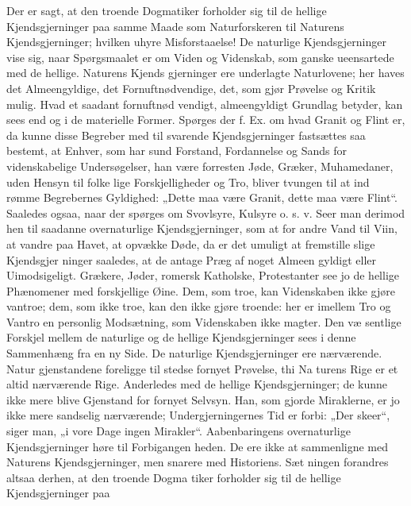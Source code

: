 \documentclass[12pt]{book}
\newcommand{\opage}[1]{\marginnote{\footnotesize\textit{[#1]}}}
\begin{document}
Der er sagt, at den troende Dogmatiker forholder
sig til de hellige Kjendsgjerninger paa samme Maade
som Naturforskeren til Naturens Kjendsgjerninger; hvilken
uhyre Misforstaaelse! De naturlige Kjendsgjerninger vise
sig, naar Spørgsmaalet er om Viden og Videnskab, som
ganske ueensartede med de hellige. Naturens Kjends\-%
gjerninger ere underlagte Naturlovene; her haves det
Almeengyldige, det Fornuftnødvendige, det, som gjør
Prøvelse og Kritik mulig. Hvad et saadant fornuftnød\-%
vendigt, almeengyldigt Grundlag betyder, kan sees end\-%
\opage{81}\setcounter{footnote}{0}%
og i de materielle Former. Spørges der f. Ex. om hvad
Granit og Flint er, da kunne disse Begreber med til\-%
svarende Kjendsgjerninger fastsættes saa bestemt, at
Enhver, som har sund Forstand, Fordannelse og Sands
for videnskabelige Undersøgelser, han være forresten
Jøde, Græker, Muhamedaner, uden Hensyn til folke\-%
lige Forskjelligheder og Tro, bliver tvungen til at ind\-%
rømme Begrebernes Gyldighed: „Dette maa være Granit,
dette maa være Flint“. Saaledes ogsaa, naar der spørges
om Svovlsyre, Kulsyre o. s. v. Seer man derimod hen
til saadanne overnaturlige Kjendsgjerninger, som at for\-%
andre Vand til Viin, at vandre paa Havet, at opvække
Døde, da er det umuligt at fremstille slige Kjendsgjer\-%
ninger saaledes, at de antage Præg af noget Almeen\-%
gyldigt eller Uimodsigeligt. Grækere, Jøder, romersk
Katholske, Protestanter see jo de hellige Phænomener med
forskjellige Øine. Dem, som troe, kan Videnskaben ikke
gjøre vantroe; dem, som ikke troe, kan den ikke gjøre
troende: her er imellem Tro og Vantro en personlig
Modsætning, som Videnskaben ikke magter. Den væ\-%
sentlige Forskjel mellem de naturlige og de hellige
Kjendsgjerninger sees i denne Sammenhæng fra en ny Side.
De naturlige Kjendsgjerninger ere nærværende. Natur\-%
gjenstandene foreligge til stedse fornyet Prøvelse, thi Na\-%
turens Rige er et altid nærværende Rige. Anderledes
med de hellige Kjendsgjerninger; de kunne ikke mere
blive Gjenstand for fornyet Selvsyn. Han, som gjorde
Miraklerne, er jo ikke mere sandselig nærværende;
Undergjerningernes Tid er forbi: „Der skeer“, siger
man, „i vore Dage ingen Mirakler“. Aabenbaringens
overnaturlige Kjendsgjerninger høre til Forbigangen\-%
heden. De ere ikke at sammenligne med Naturens
Kjendsgjerninger, men snarere med Historiens. Sæt\-%
ningen forandres altsaa derhen, at den troende Dogma\-%
\opage{82}\setcounter{footnote}{0}%
tiker forholder sig til de hellige Kjendsgjerninger paa
\end{document}
